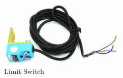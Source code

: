 \begin{figure}[H]
    \centering
    \captionsetup{justification=centering}
    \includegraphics[width = 6cm]{images/Limit_Switch.jpg}
    \caption{Limit Switch}
    \label{limit switch}
\end{figure}




